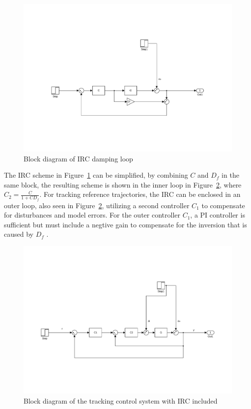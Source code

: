 \begin{figure}[h]
  \centering %
  \includegraphics[width=1\textwidth, trim=5.5cm 3cm 5.1cm 9.5cm, clip=true]{fig/matlab/irc}
  \caption{\label{fig:irc}Block diagram of IRC damping loop}
\end{figure}

The IRC scheme in Figure~\ref{fig:irc} can be simplified, by combining $C$ and $D_f$ in the same block, the resulting scheme is shown in the inner loop in Figure~\ref{fig:irc_int}, where $C_2 = \frac{C}{1+CD_f}$. For tracking reference trajectories, the IRC can be enclosed in an outer loop, also seen in Figure~\ref{fig:irc_int}, utilizing a second controller $C_1$ to compensate for disturbances and model errors. For the outer controller $C_1$, a PI controller is sufficient but must include a negtive gain to compensate for the inversion that is caused by $D_f$ \citep{gu:2014}.

\begin{figure}[h]
  \centering %
  \includegraphics[width=1\textwidth, trim=4cm 5cm 3.6cm 9.5cm, clip=true]{fig/matlab/irc_int}
  \caption{\label{fig:irc_int}Block diagram of the tracking control system with IRC included}
\end{figure}

